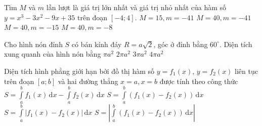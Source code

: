\begin{ex}%
Tìm $M$ và $m$ lần lượt là giá trị lớn nhất và giá trị nhỏ nhất của hàm số $y = x^3 - 3x^2 - 9x+35$ trên đoạn $[-4;4]$. 
	\choice
	{$M = 15, m = -41$}
	{\True $M = 40, m = -41$}
	{$M=  40, m = -15$}
	{$M = 40, m = -8$}
\end{ex}

\begin{ex}%
Cho hình nón đỉnh $S$ có bán kính đáy $R = a\sqrt{2}$, góc ở đỉnh bằng $60^\circ$. Diện tích xung quanh của hình nón bằng 
	\choice
	{$\pi a^2$}
	{$2\pi a^2$}
	{$3\pi a^2$}
	{\True $4\pi a^2$}
\end{ex}

\begin{ex}%
Diện tích hình phẳng giới hạn bởi đồ thị hàm số $y = f_1(x)$, $y = f_2(x)$ liên tục trên đoạn $[a;b]$ và hai đường thẳng $x = a, x = b$ được tính theo công thức
	\choice
	{$\displaystyle S =  \int\limits_{a}^{b}  f_1(x) \mathrm{\,d}x - \int\limits_{a}^{b}  f_2(x) \mathrm{\,d}x$}
	{$\displaystyle S =  \int\limits_{a}^{b} \left( f_1(x)- f_2(x)\right) \mathrm{\,d}x$}
	{\True $\displaystyle S =  \int\limits_{a}^{b} \left| f_1(x)- f_2(x)\right| \mathrm{\,d}x$}
	{$\displaystyle S = \left| \int\limits_{a}^{b} \left( f_1(x)- f_2(x)\right) \mathrm{\,d}x\right|$}
\end{ex}

